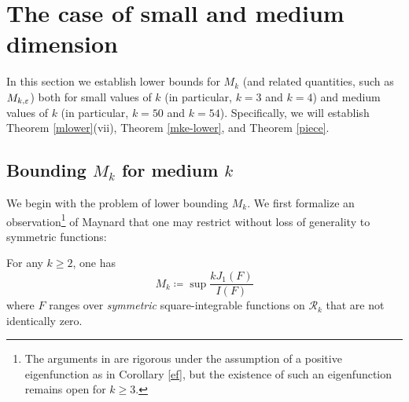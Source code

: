 \section{The case of small and medium dimension}\label{h1-sec}

In this section we establish lower bounds for $M_k$ (and related quantities, such as $M_{k,\varepsilon}$) both for small values of $k$ (in particular, $k=3$ and $k=4$) and medium values of $k$ (in particular, $k=50$ and $k=54$).  Specifically, we will establish Theorem \ref{mlower}(vii), Theorem \ref{mke-lower}, and Theorem \ref{piece}.

\subsection{Bounding \texorpdfstring{$M_k$}{Mk} for medium \texorpdfstring{$k$}{k}}

We begin with the problem of lower bounding $M_k$.  We first formalize an observation\footnote{The arguments in \cite{maynard-new} are rigorous under the assumption of a positive eigenfunction as in Corollary \ref{ef}, but the existence of such an eigenfunction remains open for $k \geq 3$.} of Maynard \cite{maynard-new} that one may restrict without loss of generality to symmetric functions:

\begin{lemma}  For any $k \geq 2$, one has
$$ M_k \coloneqq \sup \frac{k J_1(F)}{I(F)}$$
where $F$ ranges over \emph{symmetric} square-integrable functions on ${\mathcal R}_k$ that are not identically zero.
\end{lemma}

